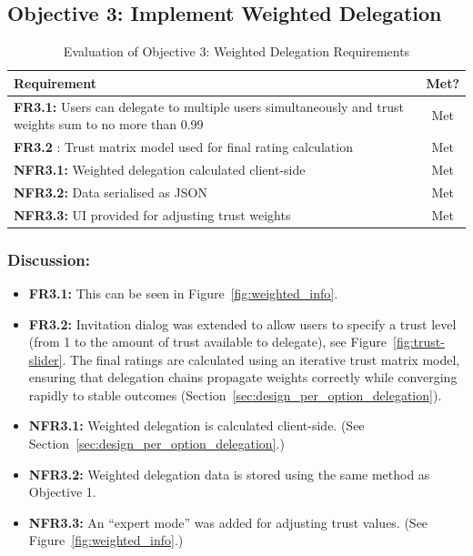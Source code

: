 \subsection{Objective 3: Implement Weighted Delegation}

\begin{table}[H]
\centering
\begin{tabular}{|p{9cm}|c|}
\hline
\textbf{Requirement} & \textbf{Met?} \\ \hline
\textbf{FR3.1:} Users can delegate to multiple users simultaneously and trust weights sum to no more than 0.99& Met \\ \hline
\textbf{FR3.2 }: Trust matrix model used for final rating calculation & Met \\ \hline
\textbf{NFR3.1:} Weighted delegation calculated client-side & Met \\ \hline
\textbf{NFR3.2:} Data serialised as JSON & Met \\ \hline
\textbf{NFR3.3:} UI provided for adjusting trust weights & Met \\ \hline
\end{tabular}
\caption{Evaluation of Objective 3: Weighted Delegation Requirements}
\label{tab:objective3_requirements}
\end{table}

\subsubsection{Discussion:}

\begin{itemize}
    \item \textbf{FR3.1:} This can be seen in Figure~\ref{fig:weighted_info}.
    \item \textbf{FR3.2:} Invitation dialog was extended to allow users to specify a trust level (from 1 to the amount of trust available to delegate), see Figure~\ref{fig:trust-slider}. The final ratings are calculated using an iterative trust matrix model, ensuring that delegation chains propagate weights correctly while converging rapidly to stable outcomes (Section~\ref{sec:design_per_option_delegation}).
    \item \textbf{NFR3.1:} Weighted delegation is calculated client-side. (See Section~\ref{sec:design_per_option_delegation}.)
    \item \textbf{NFR3.2:} Weighted delegation data is stored using the same method as Objective 1.
    \item \textbf{NFR3.3:} An ``expert mode'' was added for adjusting trust values. (See Figure~\ref{fig:weighted_info}.)

\end{itemize}

